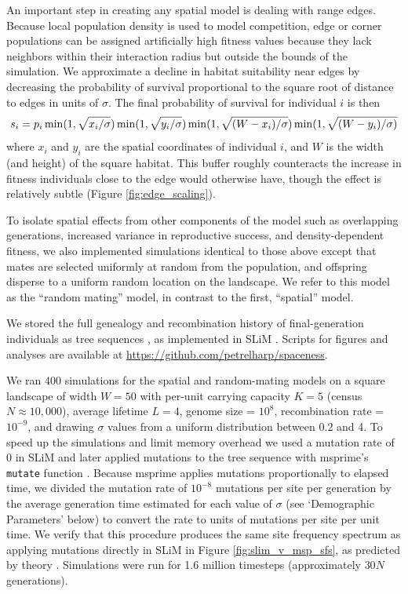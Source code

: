 \documentclass[10pt,twoside,lineno,hidelinks]{preprint}
\begin{document}
An important step in creating any spatial model is dealing with range edges. 
Because local population density is used to model competition, edge or corner populations can be assigned artificially high fitness values 
because they lack neighbors within their interaction radius but outside the bounds of the simulation.
We approximate a decline in habitat suitability near edges by decreasing the probability of survival proportional to the square root of distance to edges in units of $\sigma$. 
The final probability of survival for individual $i$ is then
\begin{equation}
    s_{i} = p_{i} 
        \min(1,\sqrt{x_{i}/\sigma})
        \min(1,\sqrt{y_{i}/\sigma})\\
        \min(1,\sqrt{(W - x_{i})/\sigma})
        \min(1,\sqrt{(W - y_{i})/\sigma)}
\end{equation}
where $x_i$ and $y_i$ are the spatial coordinates of individual $i$, and $W$ is the width (and height) of the square habitat.
This buffer roughly counteracts the increase in fitness individuals close to the edge would otherwise have, though the effect is relatively subtle (Figure \ref{fig:edge_scaling}).

To isolate spatial effects from other components of the model such as overlapping generations, increased variance in reproductive success, and density-dependent fitness,  
we also implemented simulations identical to those above except that mates are selected uniformly at random from the population,
and offspring disperse to a uniform random location on the landscape. 
We refer to this model as the ``random mating'' model, in contrast to the first, ``spatial'' model. 

We stored the full genealogy and recombination history of final-generation individuals as tree sequences \citep{Kelleher2018},
as implemented in SLiM \citep{haller2019treesequence}. 
Scripts for figures and analyses are available at \url{https://github.com/petrelharp/spaceness}.  

We ran 400 simulations for the spatial and random-mating models on a square landscape of width $W=50$  
with per-unit carrying capacity $K=5$ (census $N \approx 10,000$), 
average lifetime $L=4$, 
genome size = $10^{8}$, 
recombination rate = $10^{-9}$, 
and drawing $\sigma$ values from a uniform distribution between 0.2 and 4. 
To speed up the simulations and limit memory overhead we used a mutation rate of 0 in SLiM 
and later applied mutations to the tree sequence with msprime's \texttt{mutate} function \citep{Kelleher2016}. 
Because msprime applies mutations proportionally to elapsed time,
we divided the mutation rate of $10^{-8}$ mutations per site per generation
by the average generation time estimated for each value of $\sigma$ (see `Demographic Parameters' below) to convert the rate to units of mutations per site per unit time. 
We verify that this procedure produces the same site frequency spectrum as applying mutations directly in SLiM in Figure \ref{fig:slim_v_msp_sfs},
as predicted by theory \citep{ralph2019efficiently}.
Simulations were run for 1.6 million timesteps (approximately $30N$ generations). 
\end{document}

